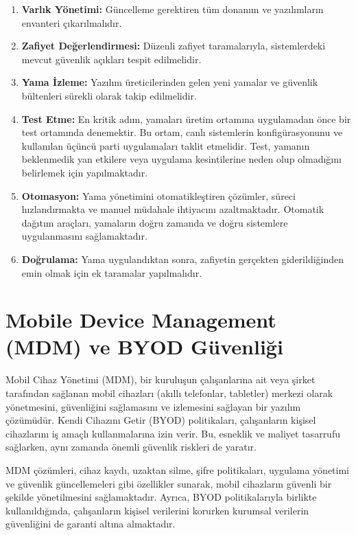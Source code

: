\begin{enumerate}
    \item \textbf{Varlık Yönetimi:} Güncelleme gerektiren tüm donanım ve yazılımların envanteri çıkarılmalıdır.
    \item \textbf{Zafiyet Değerlendirmesi:} Düzenli zafiyet taramalarıyla, sistemlerdeki mevcut güvenlik açıkları tespit edilmelidir.
    \item \textbf{Yama İzleme:} Yazılım üreticilerinden gelen yeni yamalar ve güvenlik bültenleri sürekli olarak takip edilmelidir.
    \item \textbf{Test Etme:} En kritik adım, yamaları üretim ortamına uygulamadan önce bir test ortamında denemektir. Bu ortam, canlı sistemlerin konfigürasyonunu ve kullanılan üçüncü parti uygulamaları taklit etmelidir. Test, yamanın beklenmedik yan etkilere veya uygulama kesintilerine neden olup olmadığını belirlemek için yapılmaktadır.
    \item \textbf{Otomasyon:} Yama yönetimini otomatikleştiren çözümler, süreci hızlandırmakta ve manuel müdahale ihtiyacını azaltmaktadır. Otomatik dağıtım araçları, yamaların doğru zamanda ve doğru sistemlere uygulanmasını sağlamaktadır.
    \item \textbf{Doğrulama:} Yama uygulandıktan sonra, zafiyetin gerçekten giderildiğinden emin olmak için ek taramalar yapılmalıdır.
\end{enumerate}

\section{Mobile Device Management (MDM) ve BYOD Güvenliği}

Mobil Cihaz Yönetimi (MDM), bir kuruluşun çalışanlarına ait veya şirket tarafından sağlanan mobil cihazları (akıllı telefonlar, tabletler) merkezi olarak yönetmesini, güvenliğini sağlamasını ve izlemesini sağlayan bir yazılım çözümüdür. Kendi Cihazını Getir (BYOD) politikaları, çalışanların kişisel cihazlarını iş amaçlı kullanmalarına izin verir. Bu, esneklik ve maliyet tasarrufu sağlarken, aynı zamanda önemli güvenlik riskleri de yaratır.

MDM çözümleri, cihaz kaydı, uzaktan silme, şifre politikaları, uygulama yönetimi ve güvenlik güncellemeleri gibi özellikler sunarak, mobil cihazların güvenli bir şekilde yönetilmesini sağlamaktadır. Ayrıca, BYOD politikalarıyla birlikte kullanıldığında, çalışanların kişisel verilerini korurken kurumsal verilerin güvenliğini de garanti altına almaktadır.


